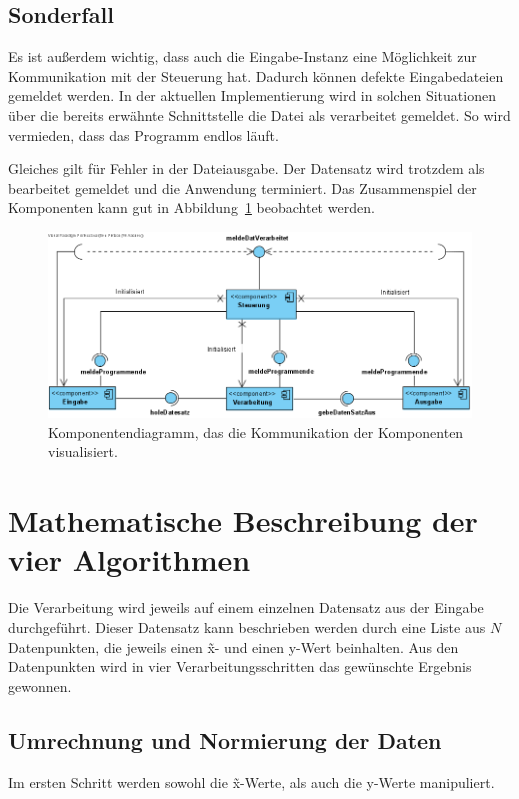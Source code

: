 \subsection{Sonderfall}\label{subsec:sonderfall}
Es ist außerdem wichtig, dass auch die Eingabe-Instanz eine Möglichkeit zur Kommunikation mit der Steuerung hat.
Dadurch können defekte Eingabedateien gemeldet werden.
In der aktuellen Implementierung wird in solchen Situationen über die bereits erwähnte Schnittstelle die Datei als verarbeitet gemeldet.
So wird vermieden, dass das Programm endlos läuft.

Gleiches gilt für Fehler in der Dateiausgabe.
Der Datensatz wird trotzdem als bearbeitet gemeldet und die Anwendung terminiert.
Das Zusammenspiel der Komponenten kann gut in Abbildung~\ref{fig:komoponent} beobachtet werden.



\begin{figure}[htb]
    \centering
    \includegraphics[width=\linewidth]{images/ComponentDiagram1}
    \caption{
        Komponentendiagramm, das die Kommunikation der Komponenten visualisiert.
    }
    \label{fig:komoponent}
\end{figure}


\section{Mathematische Beschreibung der vier Algorithmen}\label{sec:mat-beschreibung}
Die Verarbeitung wird jeweils auf einem einzelnen Datensatz aus der Eingabe durchgeführt.
Dieser Datensatz kann beschrieben werden durch eine Liste aus $N$ Datenpunkten, die jeweils einen \~x- und einen y-Wert beinhalten.
Aus den Datenpunkten wird in vier Verarbeitungsschritten das gewünschte Ergebnis gewonnen.

\subsection{Umrechnung und Normierung der Daten}\label{subsec:umrechnung-und-normierung}
Im ersten Schritt werden sowohl die \~x-Werte, als auch die y-Werte manipuliert.

